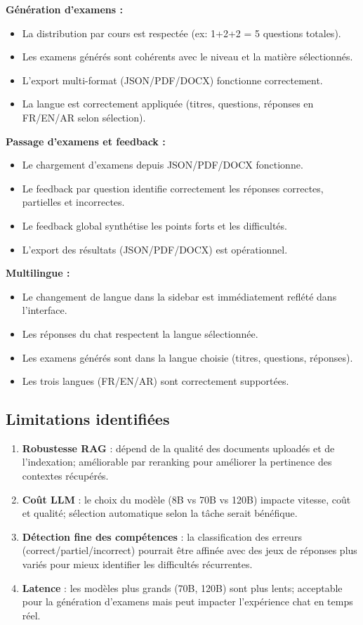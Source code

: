 \textbf{Génération d'examens :}
\begin{itemize}
    \item La distribution par cours est respectée (ex: 1+2+2 = 5 questions totales).
    \item Les examens générés sont cohérents avec le niveau et la matière sélectionnés.
    \item L'export multi-format (JSON/PDF/DOCX) fonctionne correctement.
    \item La langue est correctement appliquée (titres, questions, réponses en FR/EN/AR selon sélection).
\end{itemize}

\textbf{Passage d'examens et feedback :}
\begin{itemize}
    \item Le chargement d'examens depuis JSON/PDF/DOCX fonctionne.
    \item Le feedback par question identifie correctement les réponses correctes, partielles et incorrectes.
    \item Le feedback global synthétise les points forts et les difficultés.
    \item L'export des résultats (JSON/PDF/DOCX) est opérationnel.
\end{itemize}

\textbf{Multilingue :}
\begin{itemize}
    \item Le changement de langue dans la sidebar est immédiatement reflété dans l'interface.
    \item Les réponses du chat respectent la langue sélectionnée.
    \item Les examens générés sont dans la langue choisie (titres, questions, réponses).
    \item Les trois langues (FR/EN/AR) sont correctement supportées.
\end{itemize}

\subsection{Limitations identifiées}

\begin{enumerate}
    \item \textbf{Robustesse RAG} : dépend de la qualité des documents uploadés et de l'indexation; améliorable par reranking pour améliorer la pertinence des contextes récupérés.
    \item \textbf{Coût LLM} : le choix du modèle (8B vs 70B vs 120B) impacte vitesse, coût et qualité; sélection automatique selon la tâche serait bénéfique.
    \item \textbf{Détection fine des compétences} : la classification des erreurs (correct/partiel/incorrect) pourrait être affinée avec des jeux de réponses plus variés pour mieux identifier les difficultés récurrentes.
    \item \textbf{Latence} : les modèles plus grands (70B, 120B) sont plus lents; acceptable pour la génération d'examens mais peut impacter l'expérience chat en temps réel.
\end{enumerate}

